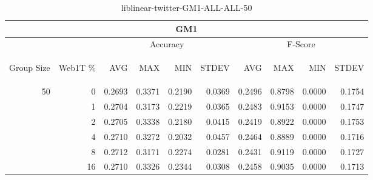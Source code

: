 \begin{center}
\begin{table}[htbp]
\begin{tabular}{ | r | r | r | r | r | r | r | r | r | r |}
\hline
\multicolumn{10}{|c|}{GM1}\\
\hline
 & & \multicolumn{4}{|c|}{Accuracy} & \multicolumn{4}{|c|}{F-Score}\\ \cline{3-10}
\begin{sideways}Group Size\end{sideways} & \begin{sideways}Web1T \%\end{sideways} & \begin{sideways}AVG\end{sideways} & \begin{sideways}MAX\end{sideways} & \begin{sideways}MIN\end{sideways} & \begin{sideways}STDEV\end{sideways} & \begin{sideways}AVG\end{sideways} & \begin{sideways}MAX\end{sideways} & \begin{sideways}MIN\end{sideways} & \begin{sideways}STDEV\end{sideways}\\
\hline
\multirow{6}{*}{50}
 & 0 & 0.2693 & 0.3371 & 0.2190 & 0.0369 & 0.2496 & 0.8798 & 0.0000 & 0.1754\\ \cline{2-10}
 & 1 & 0.2704 & 0.3173 & 0.2219 & 0.0365 & 0.2483 & 0.9153 & 0.0000 & 0.1747\\ \cline{2-10}
 & 2 & 0.2705 & 0.3338 & 0.2180 & 0.0415 & 0.2419 & 0.8922 & 0.0000 & 0.1753\\ \cline{2-10}
 & 4 & 0.2710 & 0.3272 & 0.2032 & 0.0457 & 0.2464 & 0.8889 & 0.0000 & 0.1716\\ \cline{2-10}
 & 8 & 0.2712 & 0.3171 & 0.2274 & 0.0281 & 0.2431 & 0.9119 & 0.0000 & 0.1727\\ \cline{2-10}
 & 16 & 0.2710 & 0.3326 & 0.2344 & 0.0308 & 0.2458 & 0.9035 & 0.0000 & 0.1713\\ \cline{2-10}
\hline
\end{tabular}
\caption{liblinear-twitter-GM1-ALL-ALL-50}
\end{table}
\end{center}

